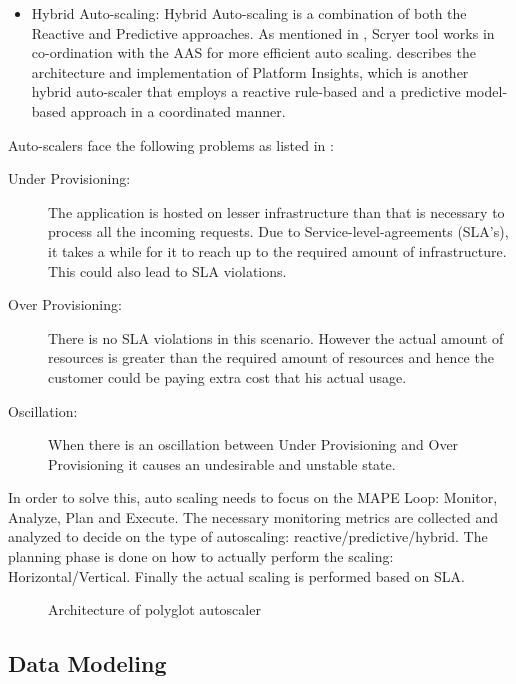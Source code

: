 \documentclass[article,type=msc,colorback,12pt,accentcolor=tud7b]{tudthesis}
\begin{document}
\begin{itemize}
\item{Hybrid Auto-scaling: } Hybrid Auto-scaling is a combination of both the Reactive and Predictive approaches. As mentioned in \cite{Scryer1}, Scryer tool works in co-ordination with the AAS for more efficient auto scaling. \cite{moore2013coordinated} describes the architecture and implementation of Platform Insights, which is another hybrid auto-scaler that employs a reactive rule-based and a predictive model-based approach in a coordinated manner.
\end{itemize}
Auto-scalers face the following problems as listed in \cite{lorido2014review}:
\begin{description}
	\item[Under Provisioning:] The application is hosted on lesser infrastructure than that is necessary to process all the incoming requests. Due to Service-level-agreements (SLA's), it takes a while for it to reach up to the required amount of infrastructure. This could also lead to SLA violations.
	
	\item[Over Provisioning:] There is no SLA violations in this scenario. However the actual amount of resources is greater than the required amount of resources and hence the customer could be paying extra cost that his actual usage.
	
	\item[Oscillation:]
		When there is an oscillation between Under Provisioning and Over Provisioning it causes an undesirable and unstable state. 
\end{description}

In order to solve this, auto scaling needs to focus on the MAPE Loop\cite{lorido2014review}: Monitor, Analyze, Plan and Execute. The necessary monitoring metrics are collected and analyzed to decide on the type of autoscaling: reactive/predictive/hybrid. The planning phase is done on how to actually perform the scaling: Horizontal/Vertical. Finally the actual scaling is performed based on SLA.

 \begin{figure}
 \begin{center}
  \makebox[\textwidth]{\texttt{[image: B4]}}
\end{center}
\caption{Architecture of polyglot autoscaler \cite{seelam2015polyglot}}
\end{figure}

	\subsection{Data Modeling}
	
\end{document}
